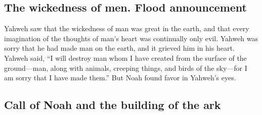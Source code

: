 \begin{paracol}{2}
\begin{otherlanguage}{english}
\hypertarget{the-wickedness-of-men.-flood-announcement}{%
\subsection{The wickedness of men. Flood
announcement}\label{the-wickedness-of-men.-flood-announcement}}

 Yahweh saw that the wickedness of man was great in the
earth, and that every imagination of the thoughts of man's heart was
continually only evil.  Yahweh was sorry that he had made
man on the earth, and it grieved him in his heart.  Yahweh
said, ``I will destroy man whom I have created from the surface of the
ground---man, along with animals, creeping things, and birds of the
sky---for I am sorry that I have made them.''  But Noah
found favor in Yahweh's eyes.

\hypertarget{call-of-noah-and-the-building-of-the-ark}{%
\subsection{Call of Noah and the building of the
ark}\label{call-of-noah-and-the-building-of-the-ark}}


\end{otherlanguage}
\end{paracol}
